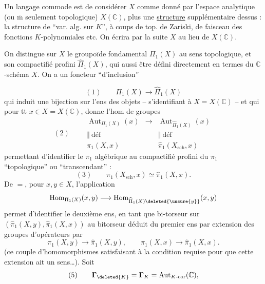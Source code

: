 Un langage commode est de considérer $X$ comme donné par l'espace analytique (ou $\overline{\mathrm m}$ seulement topologique) $X(\mathbb C)$, plus une \uline{structure} supplémentaire dessus : la structure de ``var. alg. sur $K$'', à coups de top. de Zariski, de faisceau des fonctions $K$-polynomiales etc. On écrira par la suite $X$ au lieu de $X(\mathbb C)$.

On distingue sur $X$ le groupoïde fondamental $\Pi_1(X)$ au sens topologique, et son compactifié profini $\widehat\Pi_1(X)$, qui   aussi être défini directement en termes du $\mathbb C$-schéma $X$. On a un foncteur ``d'inclusion''

\[
(1)\qquad\Pi_1(X)\longrightarrow\widehat\Pi_1(X)
\]
qui induit une bijection sur l'ens des objets  -- s'identifiant à $X=X(\mathbb C)$ -- et qui  pour tt $x\in X=X(\mathbb C)$, donne l'hom de groupes
\[
(2)\qquad
\begin{array}{ccc}
\operatorname{Aut}_{\Pi_1(X)}(x)&\longrightarrow&\operatorname{Aut}_{\widehat\Pi_1(X)}(x)\\
\Vert\ \text{déf}&&\Vert\ \text{déf}\\
\pi_1(X,x)&&\widehat\pi_1(X_{\mathrm{sch}},x)
\end{array}
\]
permettant d'identifier le $\pi_1$ algébrique au compactifié profini du $\pi_1$ ``topologique'' ou ``transcendant'' : 
\[
(3)\qquad\pi_1(X_{\mathrm{sch}},x)\simeq\widehat\pi_1(X,x).
\]
De $=$, pour $x,y\in X$, l'application
\[
\operatorname{Hom}_{\Pi_1(X)}(x,y)\longrightarrow\operatorname{Hom}_{\widehat\Pi_1(X)\deleted{\unsure{y}}}(x,y)
\]
permet d'identifier le deuxième ens, en tant que bi-torseur sur $(\widehat\pi_1(X,y),\widehat\pi_1(X,x))$ au bitorseur déduit  du premier ens par extension des groupes d'opérateurs par
\[
\pi_1(X,y)\longrightarrow\widehat\pi_1(X,y),\qquad\pi_1(X,x)\longrightarrow\widehat\pi_1(X,x).
\]
(ce couple d'homomorphismes satisfaisant  à la condition requise pour que cette extension ait un sens\ldots).
Soit
\[
(5)\qquad\mathbf{\Gamma}_{\deleted{K}}=\mathbf{\Gamma}_K=\operatorname{Aut}_{K\text{-cor}}(\mathbb C),
\]

